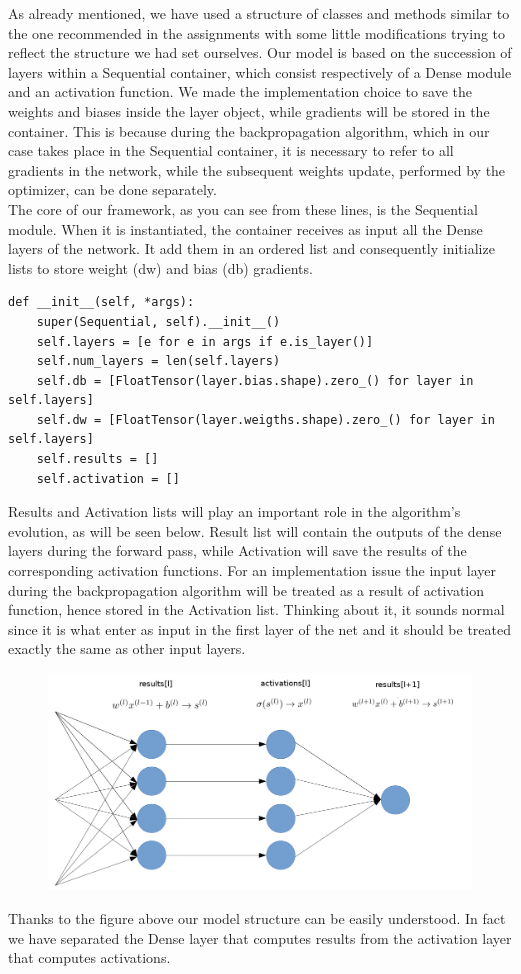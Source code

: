 As already mentioned, we have used a structure of classes and methods similar to the one recommended in the assignments with some little modifications trying to reflect the structure we had set ourselves. Our model is based on the succession of layers within a Sequential container, which consist respectively of a Dense module and an activation function. We made the implementation choice to save the weights and biases inside the layer object, while gradients will be stored in the container. This is because during the backpropagation algorithm, which in our case takes place in the Sequential container, it is necessary to refer to all gradients in the network, while the subsequent weights update, performed by the optimizer, can be done separately. \\
The core of our framework, as you can see from these lines, is the Sequential module. When it is instantiated, the container receives as input all the Dense layers of the network. It add them in an ordered list and consequently initialize lists to store weight (dw) and bias (db) gradients.

\begin{verbatim}
def __init__(self, *args):
	super(Sequential, self).__init__()
	self.layers = [e for e in args if e.is_layer()]
	self.num_layers = len(self.layers)
	self.db = [FloatTensor(layer.bias.shape).zero_() for layer in self.layers]
	self.dw = [FloatTensor(layer.weigths.shape).zero_() for layer in self.layers]
	self.results = [] 
	self.activation = []
\end{verbatim}

Results and Activation lists will play an important role in the algorithm's evolution, as will be seen below. Result list will contain the outputs of the dense layers during the forward pass, while Activation will save the results of the corresponding activation functions. For an implementation issue the input layer during the backpropagation algorithm will be treated as a result of activation function, hence stored in the Activation list. Thinking about it, it sounds normal since it is what enter as input in the first layer of the net and it should be treated exactly the same as other input layers. 
\begin{figure}[H]
	\includegraphics[width=\textwidth]{Images/netowrk.png}
	\centering
\end{figure}
Thanks to the figure above our model structure can be easily understood. In fact we have separated the Dense layer that computes results from the activation layer that computes activations. 
